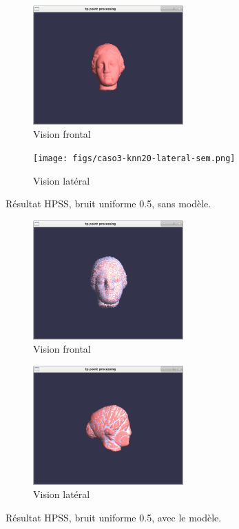 \documentclass[a4,12pt]{report}
\begin{document}
\begin{figure}[!h]
	\centering
	\begin{subfigure}[b]{0.5\textwidth}
		\centering
		\includegraphics[height=1.8in]{figs/caso3-knn20-frontal-sem.png}
		\caption{Vision frontal}
	\end{subfigure}%
	\begin{subfigure}[b]{0.5\textwidth}
		\centering
		\texttt{[image: figs/caso3-knn20-lateral-sem.png]}
		\caption{Vision latéral}
	\end{subfigure}
	\caption{Résultat HPSS, bruit uniforme 0.5,  sans modèle.}
	\label{fig:7}
\end{figure}
\begin{figure}[]
	\centering
	\begin{subfigure}[b]{0.5\textwidth}
		\centering
		\includegraphics[height=1.8in]{figs/caso4-knn20-frontal-com.png}
		\caption{Vision frontal}
	\end{subfigure}%
	\begin{subfigure}[b]{0.5\textwidth}
		\centering
		\includegraphics[height=1.8in]{figs/caso3-knn20-lateral-com.png}
		\caption{Vision latéral}
	\end{subfigure}
	\label{fig:8}
	\caption{Résultat HPSS, bruit uniforme 0.5, avec le modèle.}
\end{figure}
\pagebreak[4]
\end{document}
